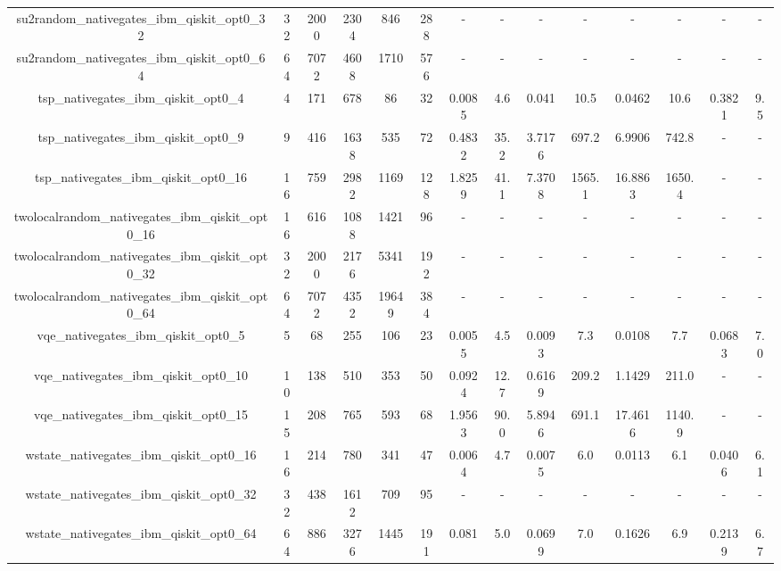 \begin{table}[htb]
{\begin{tabular}{|c|c|c|c|c|c|c|c|c|c|c|c|c|c|}
su2random\_nativegates\_ibm\_qiskit\_opt0\_32 & 32 & 2000 & 2304 & 846 & 288 & - & - & - & - & - & - & - & - \\ 
su2random\_nativegates\_ibm\_qiskit\_opt0\_64 & 64 & 7072 & 4608 & 1710 & 576 & - & - & - & - & - & - & - & - \\ 
tsp\_nativegates\_ibm\_qiskit\_opt0\_4 & 4 & 171 & 678 & 86 & 32 & 0.0085 & 4.6 & 0.041 & 10.5 & 0.0462 & 10.6 & 0.3821 & 9.5 \\ 
tsp\_nativegates\_ibm\_qiskit\_opt0\_9 & 9 & 416 & 1638 & 535 & 72 & 0.4832 & 35.2 & 3.7176 & 697.2 & 6.9906 & 742.8 & - & - \\ 
tsp\_nativegates\_ibm\_qiskit\_opt0\_16 & 16 & 759 & 2982 & 1169 & 128 & 1.8259 & 41.1 & 7.3708 & 1565.1 & 16.8863 & 1650.4 & - & - \\ 
twolocalrandom\_nativegates\_ibm\_qiskit\_opt0\_16 & 16 & 616 & 1088 & 1421 & 96 & - & - & - & - & - & - & - & - \\ 
twolocalrandom\_nativegates\_ibm\_qiskit\_opt0\_32 & 32 & 2000 & 2176 & 5341 & 192 & - & - & - & - & - & - & - & - \\ 
twolocalrandom\_nativegates\_ibm\_qiskit\_opt0\_64 & 64 & 7072 & 4352 & 19649 & 384 & - & - & - & - & - & - & - & - \\ 
vqe\_nativegates\_ibm\_qiskit\_opt0\_5 & 5 & 68 & 255 & 106 & 23 & 0.0055 & 4.5 & 0.0093 & 7.3 & 0.0108 & 7.7 & 0.0683 & 7.0 \\ 
vqe\_nativegates\_ibm\_qiskit\_opt0\_10 & 10 & 138 & 510 & 353 & 50 & 0.0924 & 12.7 & 0.6169 & 209.2 & 1.1429 & 211.0 & - & - \\ 
vqe\_nativegates\_ibm\_qiskit\_opt0\_15 & 15 & 208 & 765 & 593 & 68 & 1.9563 & 90.0 & 5.8946 & 691.1 & 17.4616 & 1140.9 & - & - \\ 
wstate\_nativegates\_ibm\_qiskit\_opt0\_16 & 16 & 214 & 780 & 341 & 47 & 0.0064 & 4.7 & 0.0075 & 6.0 & 0.0113 & 6.1 & 0.0406 & 6.1 \\ 
wstate\_nativegates\_ibm\_qiskit\_opt0\_32 & 32 & 438 & 1612 & 709 & 95 & - & - & - & - & - & - & - & - \\ 
wstate\_nativegates\_ibm\_qiskit\_opt0\_64 & 64 & 886 & 3276 & 1445 & 191 & 0.081 & 5.0 & 0.0699 & 7.0 & 0.1626 & 6.9 & 0.2139 & 6.7 \\ 
\hline 
\end{tabular}} 
\end{table} 
